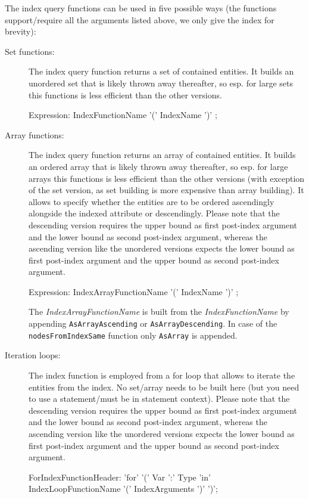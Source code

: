 The index query functions can be used in five possible ways (the functions support/require all the arguments listed above, we only give the index for brevity): 
\begin{description}
	\item[Set functions:] The index query function returns a set of contained entities. It builds an unordered set that is likely thrown away thereafter, so esp. for large sets this functions is less efficient than the other versions.
\begin{rail}
Expression:
  IndexFunctionName '(' IndexName ')' ;
\end{rail}

	\item[Array functions:] The index query function returns an array of contained entities. It builds an ordered array that is likely thrown away thereafter, so esp. for large arrays this functions is less efficient than the other versions (with exception of the set version, as set building is more expensive than array building). It allows to specify whether the entities are to be ordered ascendingly alongside the indexed attribute or descendingly.
Please note that the descending version requires the upper bound as first post-index argument and the lower bound as second post-index argument, whereas the ascending version like the unordered versions expects the lower bound as first post-index argument and the upper bound as second post-index argument.
\begin{rail}
Expression:
  IndexArrayFunctionName '(' IndexName ')' ;
\end{rail}
The \emph{IndexArrayFunctionName} is built from the \emph{IndexFunctionName} by appending \texttt{AsArrayAscending} or \texttt{AsArrayDescending}.
In case of the \texttt{nodesFromIndexSame} function only \texttt{AsArray} is appended.

	\item[Iteration loops:] The index function is employed from a for loop that allows to iterate the entities from the index. No set/array needs to be built here (but you need to use a statement/must be in statement context).
Please note that the descending version requires the upper bound as first post-index argument and the lower bound as second post-index argument, whereas the ascending version like the unordered versions expects the lower bound as first post-index argument and the upper bound as second post-index argument.

\begin{rail}
  ForIndexFunctionHeader: 'for' '(' Var ':' Type 'in' \\ IndexLoopFunctionName '(' IndexArguments ')' ')';
\end{rail}


\end{description}
